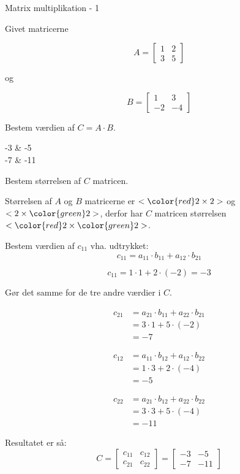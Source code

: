 \documentclass{article}
\begin{document}
\tableofcontents
\newpage

\begin{exercise}{Matrix multiplikation - 1}

Givet matricerne 

\[
A = \left[\begin{array}{rr}
1 & 2 \\ 
3 & 5 
\end{array} \right]
\]

og 

\[
B = \left[\begin{array}{rr}
1 & 3 \\ 
-2 & -4 
\end{array} \right]
\]

Bestem værdien af $C = A \cdot B$.

\begin{answermatrix}
-3 & -5  \\
-7 & -11 
\end{answermatrix}

\hint
Bestem størrelsen af $C$ matricen.

\hint
Størrelsen af $A$ og $B$ matricerne er $<{\color{red} 2} \times 2>$ og $<2 \times {\color{green}2}>$, 
derfor har $C$ matricen størrelsen $<{\color{red} 2} \times {\color{green}2}>$.

\hint
Bestem værdien af $c_{11}$ vha. udtrykket:
\[
c_{11} = a_{11} \cdot b_{11} + a_{12} \cdot b_{21}
\]

\hint
\[
c_{11} = 1 \cdot 1 + 2 \cdot (-2) = -3
\]

\hint
Gør det samme for de tre andre værdier i $C$.

\hint
\begin{align*}
c_{21} & = a_{21} \cdot b_{11} + a_{22} \cdot b_{21} \\
& = 3 \cdot 1 + 5 \cdot (-2) \\
& = -7
\end{align*}

\hint
\begin{align*}
c_{12} & = a_{11} \cdot b_{12} + a_{12} \cdot b_{22} \\
& = 1 \cdot 3 + 2 \cdot (-4) \\
& = -5
\end{align*}

\hint
\begin{align*}
c_{22} & = a_{21} \cdot b_{12} + a_{22} \cdot b_{22} \\
& = 3 \cdot 3 + 5 \cdot (-4) \\
& = -11
\end{align*}


\hint
Resultatet er så:
\[
C = \left[\begin{array}{rr}
c_{11} & c_{12} \\
c_{21} & c_{22} 
\end{array} \right] = 
\left[\begin{array}{rr}
-3 & -5 \\
-7 & -11 
\end{array} \right]
\]


\end{exercise}
\end{document}
